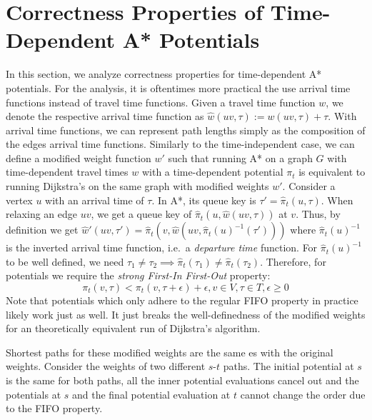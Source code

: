 \documentclass[a4paper,UKenglish,cleveref, autoref, thm-restate,anonymous]{lipics-v2021}
\begin{document}




\appendix

\section{Correctness Properties of Time-Dependent A* Potentials}\label{sec:correctness}

In this section, we analyze correctness properties for time-dependent A* potentials.
For the analysis, it is oftentimes more practical the use arrival time functions instead of travel time functions.
Given a travel time function $w$, we denote the respective arrival time function as $\hat{w}(uv, \tau) := w(uv, \tau) + \tau$.
With arrival time functions, we can represent path lengths simply as the composition of the edges arrival time functions.
Similarly to the time-independent case, we can define a modified weight function $w'$ such that running A* on a graph $G$ with time-dependent travel times $w$ with a time-dependent potential $\pi_t$ is equivalent to running Dijkstra's on the same graph with modified weights $w'$.
Consider a vertex $u$ with an arrival time of $\tau$.
In A*, its queue key is $\tau' = \hat{\pi}_t(u, \tau)$.
When relaxing an edge $uv$, we get a queue key of $\hat{\pi}_t(u, \hat{w}(uv, \tau))$ at $v$.
Thus, by definition we get $\hat{w}'(uv, \tau') = \hat{\pi}_t(v, \hat{w}(uv, \hat{\pi}_t(u)^{-1}(\tau')))$ where $\hat{\pi}_t(u)^{-1}$ is the inverted arrival time function, i.e.\ a \emph{departure time} function.
For $\hat{\pi}_t(u)^{-1}$ to be well defined, we need $\tau_1 \neq \tau_2 \implies \hat{\pi}_t(\tau_1) \neq \hat{\pi}_t(\tau_2)$.
Therefore, for potentials we require the \emph{strong First-In First-Out} property:
\[
\pi_t(v, \tau) < \pi_t(v, \tau + \epsilon) + \epsilon, v \in V, \tau \in T, \epsilon \geq 0
\]
Note that potentials which only adhere to the regular FIFO property in practice likely work just as well.
It just breaks the well-definedness of the modified weights for an theoretically equivalent run of Dijkstra's algorithm.

Shortest paths for these modified weights are the same es with the original weights.
Consider the weights of two different $s$-$t$ paths.
The initial potential at $s$ is the same for both paths, all the inner potential evaluations cancel out and the potentials at $s$ and the final potential evaluation at $t$ cannot change the order due to the FIFO property.
\end{document}
